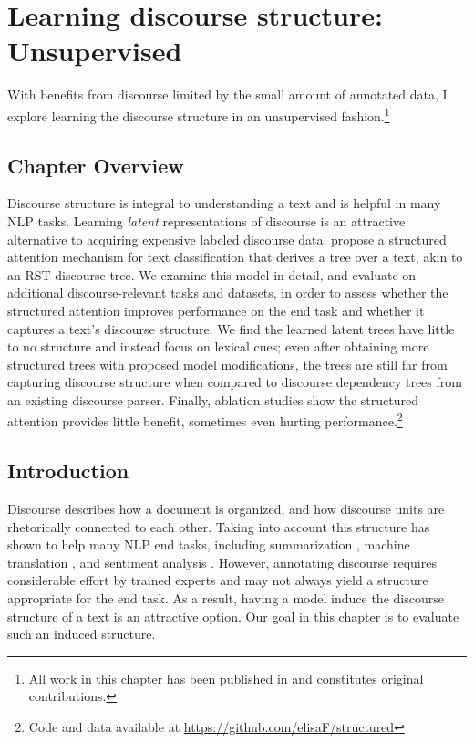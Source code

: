 \chapter{Learning discourse structure: Unsupervised}
\label{ch:latent}
With benefits from discourse limited by the small amount of annotated data, I explore learning the discourse structure in an unsupervised fashion.\footnote{All work in this chapter has been published in  and constitutes original contributions.}

\section{Chapter Overview}
Discourse structure is integral to understanding a text and is helpful in many NLP tasks. Learning \emph{latent} representations of discourse is an attractive alternative to acquiring expensive labeled discourse data.
\citet{Liu:2018} propose a structured attention mechanism for text classification that derives a tree over a text, akin to an RST discourse tree. We examine this model in detail, and evaluate on additional discourse-relevant tasks and datasets, in order to assess whether the structured attention improves performance on the end task and whether it captures a text's discourse structure. We find the learned latent trees have little to no structure and instead focus on lexical cues; even after obtaining more structured trees with proposed model modifications, the trees are still far from capturing discourse structure when compared to discourse dependency trees from an existing discourse parser. Finally, ablation studies show the structured attention provides little benefit, sometimes even hurting performance.\footnote{Code and data available at \url{https://github.com/elisaF/structured}}

\section{Introduction}
Discourse describes how a document is organized, and how discourse units are rhetorically connected to each other. 
Taking into account this structure has shown to help many NLP end tasks, including summarization \cite{Hirao:2013,Durrett:2016}, machine translation \cite{Joty:2017}, and sentiment analysis \cite{Ji:2017}. However, annotating discourse requires considerable effort by trained experts and may not always yield a structure appropriate for the end task. As a result, having a model induce the discourse structure of a text is an attractive option. Our goal in this chapter is to evaluate such an induced structure. 

